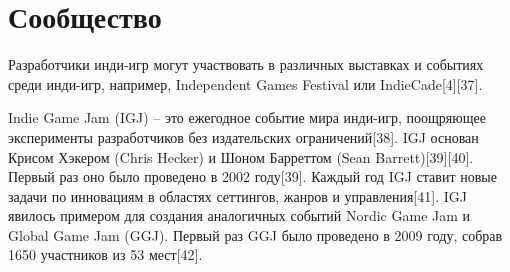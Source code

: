 \section{Сообщество}

Разработчики инди-игр могут участвовать в различных выставках и событиях среди инди-игр, например, 
Independent Games Festival или IndieCade[4][37].

Indie Game Jam (IGJ) -- это ежегодное событие мира инди-игр, поощряющее эксперименты разработчиков без 
издательских ограничений[38]. IGJ основан Крисом Хэкером (Chris Hecker) и Шоном Барреттом 
(Sean Barrett)[39][40]. Первый раз оно было проведено в 2002 году[39]. Каждый год IGJ ставит новые задачи по 
инновациям в областях сеттингов, жанров и управления[41]. IGJ явилось примером для создания аналогичных 
событий Nordic Game Jam и Global Game Jam (GGJ). Первый раз GGJ было проведено в 2009 году, собрав 1650 
участников из 53 мест[42].

